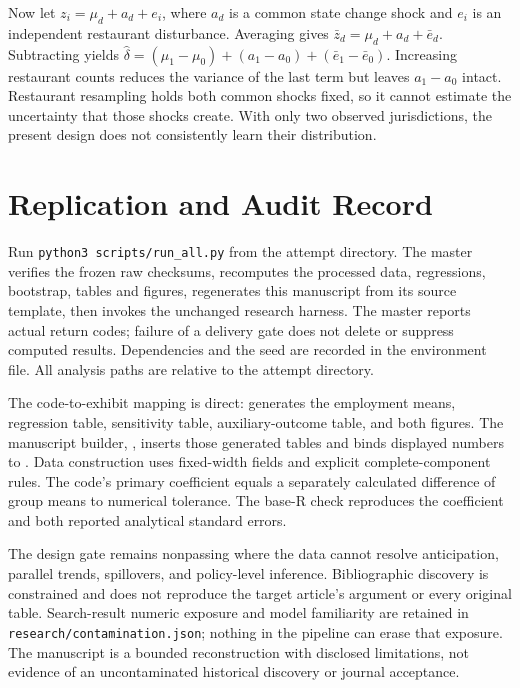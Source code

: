 \documentclass[11pt]{article}
\begin{document}
Now let $z_i=\mu_d+a_d+e_i$, where $a_d$ is a common state change shock and $e_i$ is an independent restaurant disturbance. Averaging gives $\bar z_d=\mu_d+a_d+\bar e_d$. Subtracting yields $\widehat\delta=(\mu_1-\mu_0)+(a_1-a_0)+(\bar e_1-\bar e_0)$. Increasing restaurant counts reduces the variance of the last term but leaves $a_1-a_0$ intact. Restaurant resampling holds both common shocks fixed, so it cannot estimate the uncertainty that those shocks create. With only two observed jurisdictions, the present design does not consistently learn their distribution. %

\section{Replication and Audit Record}
Run \texttt{python3 scripts/run\_all.py} from the attempt directory. The master verifies the frozen raw checksums, recomputes the processed data, regressions, bootstrap, tables and figures, regenerates this manuscript from its source template, then invokes the unchanged research harness. The master reports actual return codes; failure of a delivery gate does not delete or suppress computed results. Dependencies and the seed are recorded in the environment file. All analysis paths are relative to the attempt directory. %

The code-to-exhibit mapping is direct:  generates the employment means, regression table, sensitivity table, auxiliary-outcome table, and both figures. The manuscript builder, , inserts those generated tables and binds displayed numbers to . Data construction uses fixed-width fields and explicit complete-component rules. The code's primary coefficient equals a separately calculated difference of group means to numerical tolerance. The base-R check reproduces the coefficient and both reported analytical standard errors. %

The design gate remains nonpassing where the data cannot resolve anticipation, parallel trends, spillovers, and policy-level inference. Bibliographic discovery is constrained and does not reproduce the target article's argument or every original table. Search-result numeric exposure and model familiarity are retained in \texttt{research/contamination.json}; nothing in the pipeline can erase that exposure. The manuscript is a bounded reconstruction with disclosed limitations, not evidence of an uncontaminated historical discovery or journal acceptance. %
\end{document}
